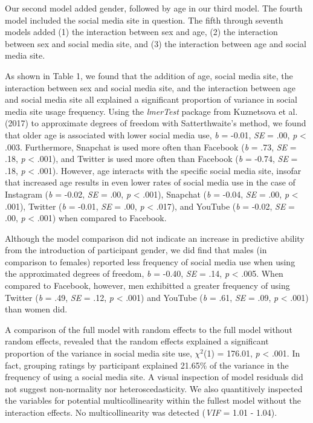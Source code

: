\documentclass[man]{apa6}
\theoremstyle{definition}
\theoremstyle{definition}
\theoremstyle{definition}
\theoremstyle{remark}
\begin{document}
Our second model added gender, followed by age in our third model. The
fourth model included the social media site in question. The fifth
through seventh models added (1) the interaction between sex and age,
(2) the interaction between sex and social media site, and (3) the
interaction between age and social media site.

As shown in Table 1, we found that the addition of age, social media
site, the interaction between sex and social media site, and the
interaction between age and social media site all explained a
significant proportion of variance in social media site usage frequency.
Using the \emph{lmerTest} package from Kuznetsova et al. (2017) to
approximate degrees of freedom with Satterthwaite's method, we found
that older age is associated with lower social media use, \emph{b} =
-0.01, \emph{SE} = .00, \emph{p} \textless{} .003. Furthermore, Snapchat
is used more often than Facebook (\emph{b} = .73, \emph{SE} = .18,
\emph{p} \textless{} .001), and Twitter is used more often than Facebook
(\emph{b} = -0.74, \emph{SE} = .18, \emph{p} \textless{} .001). However,
age interacts with the specific social media site, insofar that
increased age results in even lower rates of social media use in the
case of Instagram (\emph{b} = -0.02, \emph{SE} = .00, \emph{p}
\textless{} .001), Snapchat (\emph{b} = -0.04, \emph{SE} = .00, \emph{p}
\textless{} .001), Twitter (\emph{b} = -0.01, \emph{SE} = .00, \emph{p}
\textless{} .017), and YouTube (\emph{b} = -0.02, \emph{SE} = .00,
\emph{p} \textless{} .001) when compared to Facebook.

Although the model comparison did not indicate an increase in predictive
ability from the introduction of participant gender, we did find that
males (in comparison to females) reported less frequency of social media
use when using the approximated degrees of freedom, \emph{b} = -0.40,
\emph{SE} = .14, \emph{p} \textless{} .005. When compared to Facebook,
however, men exhibitted a greater frequency of using Twitter (\emph{b} =
.49, \emph{SE} = .12, \emph{p} \textless{} .001) and YouTube (\emph{b} =
.61, \emph{SE} = .09, \emph{p} \textless{} .001) than women did.

A comparison of the full model with random effects to the full model
without random effects, revealed that the random effects explained a
significant proportion of the variance in social media site use,
\(\chi^2\)(1) = 176.01, \emph{p} \textless{} .001. In fact, grouping
ratings by participant explained 21.65\% of the variance in the
frequency of using a social media site. A visual inspection of model
residuals did not suggest non-normality nor heteroscedasticity. We also
quantitively inspected the variables for potential multicollinearity
within the fullest model without the interaction effects. No
multicollinearity was detected (\emph{VIF} = 1.01 - 1.04).
\end{document}
